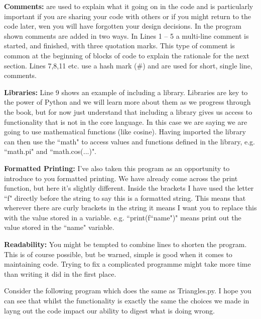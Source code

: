 \begin{minipage}{\textwidth}

\end{minipage}

\textbf{Comments:} are used to explain what it going on in the code and is particularly important if you are sharing your code with others or if you might return to the code later, wen you will have forgotten your design decisions. In the program shown comments are added in two ways. In Lines 1 -- 5 a multi-line comment is started, and finished, with three quotation marks. This type of comment is common at the beginning of blocks of code to explain the rationale for the next section. Lines 7,8,11 etc. use a hash mark (\#) and are used for short, single line, comments.

\textbf{Libraries:} Line 9 shows an example of including a library. Libraries are key to the power of Python and we will learn more about them as we progress through the book, but for now just understand that including a library gives us access to functionality that is not in the core language. In this case we are saying we are going to use mathematical functions (like cosine). Having imported the library can then use the ``math" to access values and functions defined in the library, e.g. ``math.pi" and ``math.cos(...)".

\textbf{Formatted Printing:} I've also taken this program as an opportunity to introduce to you formatted printing. We have already come across the print function, but here it's slightly different. Inside the brackets I have used the letter ``f" directly before the string to say this is a formatted string. This means that wherever there are curly brackets in the string it means I want you to replace this with the value stored in a variable. e.g. ``print(f``{name}")" means print out the value stored in the ``name" variable.

\textbf{Readability:} You might be tempted to combine lines to shorten the program. This is of course possible, but be warned, simple is good when it comes to maintaining code. Trying to fix a complicated programme might take more time than writing it did in the first place.

Consider the following program which does the same as Triangles.py. I hope you can see that whilst the functionality is exactly the same the choices we made in layng out the code impact our ability to digest what is doing wrong.

